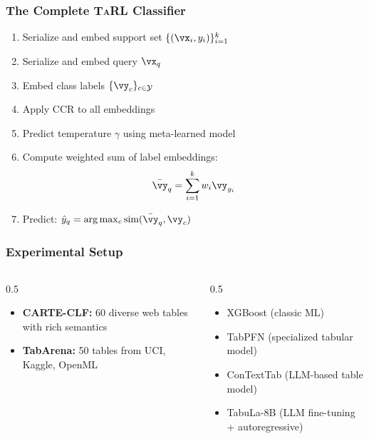 \documentclass[
	10pt, %
	aspectratio=169, %
]{beamer}
\newcommand{\tarl}{\textbf{\textsc{TaRL}}}
\begin{document}
\begin{frame}
	\frametitle{The Complete \tarl{} Classifier}
	\begin{enumerate}
		\item Serialize and embed support set $\{(\vx_i, y_i)\}_{i=1}^k$
		\item Serialize and embed query $\vx_q$
		\item Embed class labels $\{\vy_c\}_{c \in \mathcal{Y}}$
		\item Apply CCR to all embeddings
		\item Predict temperature $\gamma$ using meta-learned model
		\item Compute weighted sum of label embeddings:
		      \[
			      \bar{\vy}_q = \sum_{i=1}^k w_i \vy_{y_i}
		      \]
		\item Predict: $\hat{y}_q = \arg\max_{c} \text{sim}(\bar{\vy}_q, \vy_c)$
	\end{enumerate}
\end{frame}

\begin{frame}
	\frametitle{Experimental Setup}
	\begin{columns}[c]
		\begin{column}{0.5\textwidth}
			\begin{itemize}
				\item \textbf{CARTE-CLF:} 60 diverse web tables with rich semantics~\cite{kasneciEnrichingTabularData2024}
				\item \textbf{TabArena:} 50 tables from UCI, Kaggle, OpenML~\cite{ericksonTabArenaLivingBenchmark2025}
			\end{itemize}
		\end{column}
		\begin{column}{0.5\textwidth}
			\begin{itemize}
				\item XGBoost (classic ML)
				\item TabPFN (specialized tabular model)
				\item ConTextTab (LLM-based table model)
				\item TabuLa-8B (LLM fine-tuning + autoregressive)
			\end{itemize}
		\end{column}
	\end{columns}
\end{frame}
\end{document}
